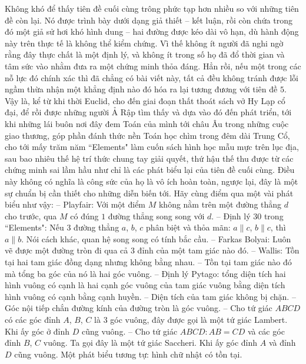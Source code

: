 \begin{multicols}{2}
	Không khó để thấy tiên đề cuối cùng trông phức tạp hơn nhiều so với những tiên đề còn lại. Nó được trình bày dưới dạng giả thiết -- kết luận, rồi còn chứa trong đó một giả sử hơi khó hình dung -- hai đường được kéo dài vô hạn, dù hành động này trên thực tế là không thể kiểm chứng. Vì thế không ít người đã nghi ngờ rằng đây thực chất là một định lý, và không ít trong số họ đã đổ thời gian và tâm sức vào nhằm đưa ra một chứng minh thỏa đáng. Hẳn rồi, nếu một trong các nỗ lực đó chính xác thì đã chẳng có bài viết này, tất cả đều không tránh được lỗi ngầm thừa nhận một khẳng định nào đó hóa ra lại tương đương với tiên đề $5$. Vậy là, kể từ khi thời Euclid, cho đến giai đoạn thất thoát sách vở Hy Lạp cổ đại, để rồi được những người Ả Rập tìm thấy và dựa vào đó đến phát triển, tới khi những lái buôn nơi đây đem Toán của mình tới châu Âu trong những cuộc giao thương, góp phần đánh thức nền Toán học chìm trong đêm dài Trung Cổ, cho tới mấy trăm năm ``Elements" làm cuốn sách hình học mẫu mực trên lục địa, sau bao nhiêu thế hệ trí thức chung tay giải quyết, thứ hậu thế thu được từ các chứng minh sai lầm hầu như chỉ là các phát biểu lại của tiên đề cuối cùng. 
	\vskip 0.1cm
	Điều này không có nghĩa là công sức của họ là vô ích hoàn toàn, ngược lại, đây là một sự chuẩn bị cần thiết cho những diễn biến tới. Hãy cùng điểm qua một vài phát biểu như vậy: 
	\vskip 0.1cm
	-- Playfair: Với một điểm $M$ không nằm trên một đường thẳng $d$ cho trước, qua $M$ có đúng $1$ đường thẳng song song với $d$. 
	\vskip 0.1cm 
	-- Định lý $30$ trong ``Elements": Nếu $3$ đường thẳng $a$, $b$, $c$ phân biệt và thỏa mãn: $a \parallel c$, $b \parallel c$, thì $a \parallel b$. Nói cách khác, quan hệ song song có tính bắc cầu.
	\vskip 0.1cm
	-- Farkas Bolyai: Luôn vẽ được một đường tròn đi qua cả $3$ đỉnh của một tam giác nào đó.
	\vskip 0.1cm
	-- Wallis: Tồn tại hai tam giác đồng dạng nhưng không bằng nhau.
	\vskip 0.1cm
	-- Tồn tại tam giác nào đó mà tổng ba góc của nó là hai góc vuông.
	\vskip 0.1cm
	-- Định lý Pytago: tổng diện tích hai hình vuông có cạnh là hai cạnh góc vuông của tam giác vuông bằng diện tích hình vuông có cạnh bằng cạnh huyền.
	\vskip 0.1cm
	-- Diện tích của tam giác không bị chặn.
	\vskip 0.1cm
	-- Góc nội tiếp chắn đường kính của đường tròn là góc vuông.
	\vskip 0.1cm
	-- Cho tứ giác $ABCD$ có các góc đỉnh $A$, $B$, $C$ là $3$ góc vuông, đây được gọi là một tứ giác Lambert. Khi ấy góc ở đỉnh $D$ cũng vuông.
	\vskip 0.1cm
	-- Cho tứ giác $ABCD: AB = CD$ và các góc đỉnh $B$, $C$ vuông. Ta gọi đây là một tứ giác Saccheri. Khi ấy góc đỉnh $A$ và đỉnh $D$ cũng vuông. Một phát biểu tương tự: hình chữ nhật có tồn tại.

\end{multicols}
